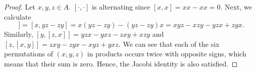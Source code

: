 \begin{proof}
  Let $x, y, z \in A$.
  $[\cdot, \cdot]$ is alternating since $[x, x] = x x - x x = 0$.
  Next, we calculate
  \begin{equation}
    [x, [y, z]]
    = [x, y z - z y]
    = x (y z - z y) - (y z - z y) x
    = x y z - x z y - y z x + z y x.
  \end{equation}
  Similarly,
  $[y, [z, x]] = y z x - y x z - z x y + x z y$ and
  $[z, [x, y]] = z x y - z y x - x y z + y x z$.
  We can see that each of the six permutations of $(x, y, z)$ in products occurs
  twice with opposite signs, which means that their sum is zero.
  Hence, the Jacobi identity is also satisfied.
\end{proof}
